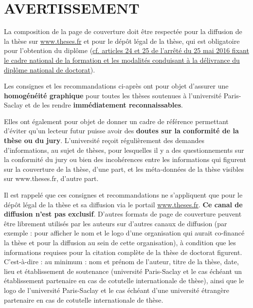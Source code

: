 \documentclass[main=french,a4paper]{book}
\begin{document}

\section{AVERTISSEMENT}
La composition de la page de couverture doit être respectée pour la diffusion de la thèse sur \url{www.theses.fr} et pour le dépôt légal de la thèse, qui est obligatoire pour l’obtention du diplôme (\href{https://www.legifrance.gouv.fr/affichTexte.do?cidTexte=JORFTEXT000032587086&dateTexte=20160902}{cf. articles 24 et 25 de l’arrêté du 25 mai 2016 fixant le cadre national de la formation et les modalités conduisant à la délivrance du diplôme national de doctorat}).\\ \par
Les consignes et les recommandations ci-après ont pour objet d’assurer une \textbf{homogénéité graphique} pour toutes les thèses soutenues à l’université Paris-Saclay et de les rendre \textbf{immédiatement reconnaissables}.\\ \par
Elles ont également pour objet de donner un cadre de référence permettant d’éviter qu’un lecteur futur puisse avoir des \textbf{doutes sur la conformité de la thèse ou du jury}. L’université reçoit régulièrement des demandes d’informations, au sujet de thèses, pour lesquelles il y a des questionnements sur la conformité du jury ou bien des incohérences entre les informations qui figurent sur la couverture de la thèse, d’une part, et les méta-données de la thèse visibles sur www.theses.fr, d’autre part.\\ \par
Il est rappelé que ces consignes et recommandations ne s’appliquent que pour le dépôt légal de la thèse et sa diffusion via le portail \url{www.theses.fr}. \textbf{Ce canal de diffusion n’est pas exclusif}. D’autres formats de page de couverture peuvent être librement utilisés par les auteurs sur d’autres canaux de diffusion (par exemple : pour afficher le nom et le logo d’une organisation qui aurait co-financé la thèse et pour la diffusion au sein de cette organisation), à condition que les informations requises pour la citation complète de la thèse de doctorat figurent. C’est-à-dire : au minimum : nom et prénom de l’auteur, titre de la thèse, date, lieu et établissement de soutenance (université Paris-Saclay et le cas échéant un établissement partenaire en cas de cotutelle internationale de thèse), ainsi que le logo de l’université Paris-Saclay et le cas échéant d’une université étrangère partenaire en cas de cotutelle internationale de thèse.
\end{document}
